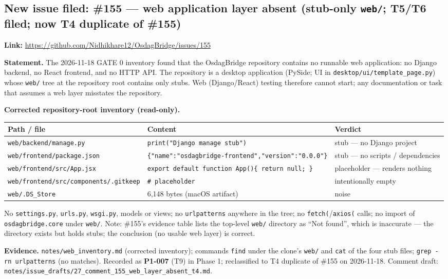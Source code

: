 \documentclass[11pt,a4paper]{article}
\begin{document}
\subsection{New issue filed: \#155 --- web application layer absent (stub-only \texttt{web/}; T5/T6 filed; now T4 duplicate of \#155)}
\textbf{Link:} \url{https://github.com/Nidhikhare12/OsdagBridge/issues/155}

\textbf{Statement.} The 2026-11-18 GATE 0 inventory found that the OsdagBridge repository contains no runnable web application: no Django backend, no React frontend, and no HTTP API. The repository is a desktop application (PySide; UI in \texttt{desktop/ui/template\_page.py}) whose \texttt{web/} tree at the repository root contains only stubs. Web (Django/React) testing therefore cannot start; any documentation or task that assumes a web layer misstates the repository.

\textbf{Corrected repository-root inventory (read-only).}

\begin{longtable}{@{}p{5.2cm}p{5.6cm}p{4.2cm}@{}}
\toprule
Path / file & Content & Verdict \\
\midrule
\texttt{web/backend/manage.py} & \texttt{print("Django manage stub")} & stub --- no Django project \\
\texttt{web/frontend/package.json} & \texttt{\{"name":"osdagbridge-frontend","version":"0.0.0"\}} & stub --- no scripts / dependencies \\
\texttt{web/frontend/src/App.jsx} & \texttt{export default function App()\{ return null; \}} & placeholder --- renders nothing \\
\texttt{web/frontend/src/components/.gitkeep} & \texttt{\# placeholder} & intentionally empty \\
\texttt{web/.DS\_Store} & 6,148 bytes (macOS artifact) & noise \\
\bottomrule
\end{longtable}

No \texttt{settings.py}, \texttt{urls.py}, \texttt{wsgi.py}, models or views; no \texttt{urlpatterns} anywhere in the tree; no \texttt{fetch(}/\texttt{axios(} calls; no import of \texttt{osdagbridge.core} under \texttt{web/}. Note: \#155's evidence table lists the top-level \texttt{web/} directory as ``Not found'', which is inaccurate --- the directory exists but holds stubs; the conclusion (no usable web layer) is correct.

\textbf{Evidence.} \texttt{notes/web\_inventory.md} (corrected inventory); commands \texttt{find} under the clone's \texttt{web/} and \texttt{cat} of the four stub files; \texttt{grep -rn urlpatterns} (no matches). Recorded as \textbf{P1-007} (T9) in Phase 1; reclassified to T4 duplicate of \#155 on 2026-11-18. Comment draft: \texttt{notes/issue\_drafts/27\_comment\_155\_web\_layer\_absent\_t4.md}.
\end{document}
